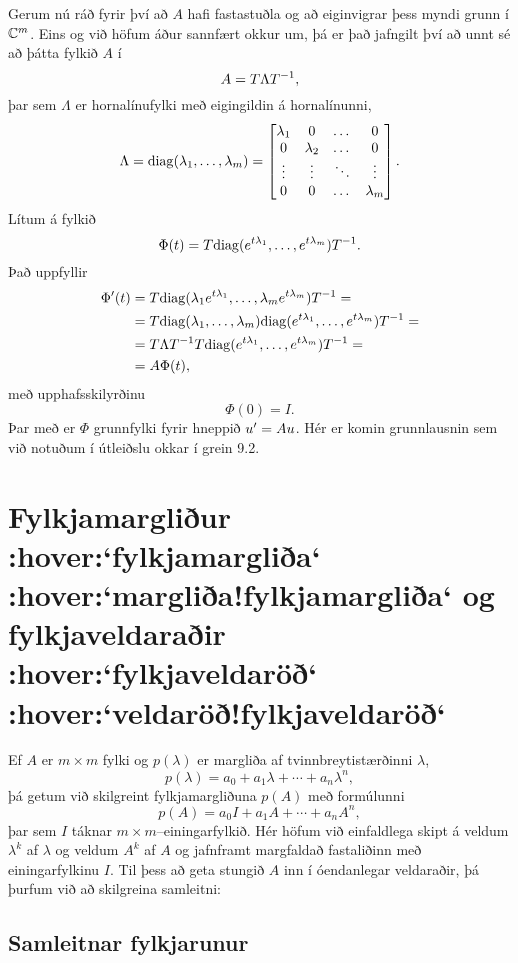 Gerum nú ráð fyrir því að $A$ hafi fastastuðla og að eiginvigrar þess
myndi grunn í ${\mathbb C}\sp m$.  Eins og við höfum áður sannfært okkur um,
þá er það jafngilt því að unnt sé að þátta fylkið $A$ í 
 $$A=T\Lambda T\sp{-1},
 $$
þar sem $\Lambda$ er hornalínufylki með eigingildin á hornalínunni,
 $$\Lambda={\operatorname{diag}}(\lambda_1,\dots,\lambda_m)=\left[\begin{matrix} 
\lambda_1&0&\dots&0\\
0&\lambda_2&\dots&0\\
\vdots&\vdots&\ddots&\vdots\\
0&0&\dots&\lambda_m\end{matrix}\right].
 $$
Lítum á fylkið 
 $$\Phi(t)=T{\operatorname{diag}}(e\sp{t\lambda_1},\dots,e\sp{t\lambda_m})T\sp{-1}.
 $$
Það uppfyllir
\begin{align*}
\Phi{\sp{\prime}}(t)
&=T{\operatorname{diag}}(\lambda_1e\sp{t\lambda_1},\dots,\lambda_me\sp{t\lambda_m})T\sp{-1}=\\
&=T{\operatorname{diag}}(\lambda_1,\dots,\lambda_m)
{\operatorname{diag}}(e\sp{t\lambda_1},\dots,e\sp{t\lambda_m})T\sp{-1}=\\
&=T\Lambda T\sp{-1} T
{\operatorname{diag}}(e\sp{t\lambda_1},\dots,e\sp{t\lambda_m})T\sp{-1}=\\
&=A\Phi(t), 
\end{align*}
með upphafsskilyrðinu
$$
\Phi(0)=I.
$$
Þar með er $\Phi$ grunnfylki fyrir hneppið $u{\sp{\prime}} =Au$.  Hér er
komin grunnlausnin sem við notuðum í útleiðslu okkar í grein 9.2.


\section{Fylkjamargliður :hover:`fylkjamargliða` :hover:`margliða!fylkjamargliða` og
fylkjaveldaraðir :hover:`fylkjaveldaröð` :hover:`veldaröð!fylkjaveldaröð`}

\noindent
Ef $A$ er $m\times m$ fylki og $p(\lambda)$ er margliða af
tvinnbreytistærðinni $\lambda$, 
 $$p(\lambda)=a_0+a_1\lambda+\cdots+a_n\lambda^n, 
 $$
þá getum við skilgreint  fylkjamargliðuna $p(A)$ með formúlunni
 $$p(A)=a_0 I+a_1A+\cdots+a_n A^n, 
 $$
þar sem $I$ táknar $m\times m$--einingarfylkið.  Hér höfum við
einfaldlega skipt á veldum $\lambda^k$ af $\lambda$ og veldum $A^k$
af $A$ og jafnframt margfaldað fastaliðinn með einingarfylkinu $I$. 
Til þess að geta stungið $A$ inn í  óendanlegar veldaraðir, þá þurfum
við að skilgreina samleitni:

\subsection*{Samleitnar fylkjarunur}

